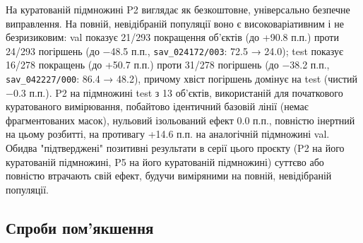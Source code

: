\documentclass[11pt]{article}
\begin{document}
На куратованій підмножині P2 виглядає як безкоштовне, універсально безпечне виправлення. На повній, невідібраній популяції воно є високоваріативним і не безризиковим: val показує 21/293 покращення об'єктів (до +90.8 п.п.) проти 24/293 погіршень (до −48.5 п.п., \texttt{sav\_024172/003}: 72.5 → 24.0); test показує 16/278 покращень (до +50.7 п.п.) проти 31/278 погіршень (до −38.2 п.п., \texttt{sav\_042227/000}: 86.4 → 48.2), причому хвіст погіршень домінує на test (чистий −0.3 п.п.). P2 на підмножині test з 13 об'єктів, використаній для початкового куратованого вимірювання, побайтово ідентичний базовій лінії (немає фрагментованих масок), нульовий ізольований ефект 0.0 п.п., повністю інертний на цьому розбитті, на противагу +14.6 п.п. на аналогічній підмножині val. Обидва "підтверджені" позитивні результати в серії цього проєкту (P2 на його куратованій підмножині, P5 на його куратованій підмножині) суттєво або повністю втрачають свій ефект, будучи виміряними на повній, невідібраній популяції.

\subsection{Спроби пом'якшення}
\end{document}
